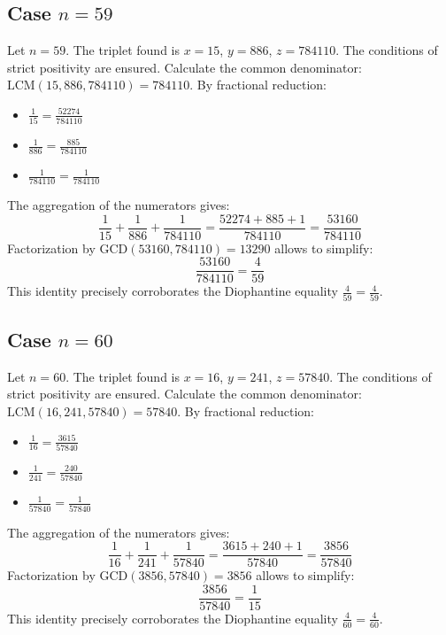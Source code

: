 \documentclass[11pt,a4paper]{article}
\begin{document}
\subsection{Case $n = 59$}
Let $n = 59$. The triplet found is $x = 15$, $y = 886$, $z = 784110$.
The conditions of strict positivity are ensured.
Calculate the common denominator: $\text{LCM}(15, 886, 784110) = 784110$.
By fractional reduction:
\begin{itemize}
    \item $\frac{1}{15} = \frac{52274}{784110}$
    \item $\frac{1}{886} = \frac{885}{784110}$
    \item $\frac{1}{784110} = \frac{1}{784110}$
\end{itemize}
The aggregation of the numerators gives:
$$ \frac{1}{15} + \frac{1}{886} + \frac{1}{784110} = \frac{52274 + 885 + 1}{784110} = \frac{53160}{784110} $$
Factorization by $\text{GCD}(53160, 784110) = 13290$ allows to simplify:
$$ \frac{53160}{784110} = \frac{4}{59} $$
This identity precisely corroborates the Diophantine equality $\frac{4}{59} = \frac{4}{59}$.

\subsection{Case $n = 60$}
Let $n = 60$. The triplet found is $x = 16$, $y = 241$, $z = 57840$.
The conditions of strict positivity are ensured.
Calculate the common denominator: $\text{LCM}(16, 241, 57840) = 57840$.
By fractional reduction:
\begin{itemize}
    \item $\frac{1}{16} = \frac{3615}{57840}$
    \item $\frac{1}{241} = \frac{240}{57840}$
    \item $\frac{1}{57840} = \frac{1}{57840}$
\end{itemize}
The aggregation of the numerators gives:
$$ \frac{1}{16} + \frac{1}{241} + \frac{1}{57840} = \frac{3615 + 240 + 1}{57840} = \frac{3856}{57840} $$
Factorization by $\text{GCD}(3856, 57840) = 3856$ allows to simplify:
$$ \frac{3856}{57840} = \frac{1}{15} $$
This identity precisely corroborates the Diophantine equality $\frac{4}{60} = \frac{4}{60}$.
\end{document}
